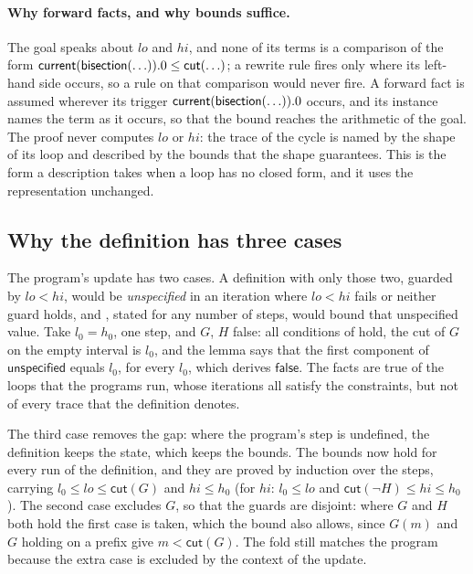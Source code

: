 \paragraph{Why forward facts, and why bounds suffice.} The goal speaks about $lo$ and $hi$, and none of its terms is a
comparison of the form $\mathsf{current}(\mathsf{bisection}(\ldots)).0 \le \mathsf{cut}(\ldots)$; a rewrite rule fires only where its
left-hand side occurs, so a rule on that comparison would never fire. A forward fact is assumed wherever its trigger
$\mathsf{current}(\mathsf{bisection}(\ldots)).0$ occurs, and its instance names the term as it occurs, so that the bound reaches the
arithmetic of the goal. The proof never computes $lo$ or $hi$: the trace of the cycle is named by the shape of its loop
and described by the bounds that the shape guarantees. This is the form a description takes when a loop has no closed
form, and it uses the representation unchanged.

\subsection{Why the definition has three cases}
The program's update has two cases. A definition with only those two, guarded by $lo < hi$, would be
\emph{unspecified} in an iteration where $lo < hi$ fails or neither guard holds, and , stated for
any number of steps, would bound that unspecified value. Take $l_0 = h_0$, one step, and $G$, $H$ false: all
conditions of  hold, the cut of $G$ on the empty interval is $l_0$, and the lemma says that the
first component of $\mathsf{unspecified}$ equals $l_0$, for every $l_0$, which derives $\mathsf{false}$. The facts
are true of the loops that the programs run, whose iterations all satisfy the constraints, but not of every trace
that the definition denotes.

The third case removes the gap: where the program's step is undefined, the definition keeps the state, which keeps
the bounds. The bounds now hold for every run of the definition, and they are proved by induction over the steps,
carrying $l_0 \le lo \le \mathsf{cut}(G)$ and $hi \le h_0$ (for $hi$: $l_0 \le lo$ and $\mathsf{cut}(\neg H) \le hi \le h_0$).
The second case excludes $G$, so that the guards are disjoint: where $G$ and $H$ both hold the first case is taken,
which the bound also allows, since $G(m)$ and $G$ holding on a prefix give $m < \mathsf{cut}(G)$. The fold still
matches the program because the extra case is excluded by the context of the update.

